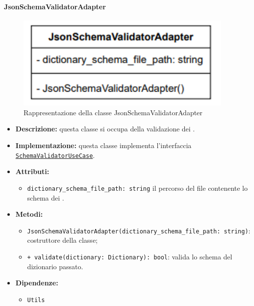 
\paragraph{JsonSchemaValidatorAdapter} \label{JsonSchemaValidatorAdapter}
\begin{figure}[H]
    \centering
    \includegraphics[width=0.95\textwidth]{assets/Backend/json_schema_validator_adapter.png}
    \caption{Rappresentazione della classe JsonSchemaValidatorAdapter}
  \end{figure}
\begin{itemize}
    \item \textbf{Descrizione:} questa classe si occupa della validazione dei .
    \item \textbf{Implementazione:} questa classe implementa l'interfaccia \hyperref[SchemaValidatorUseCase]{\texttt{SchemaValidatorUseCase}}.
    \item \textbf{Attributi:}
    \begin{itemize}
        \item \texttt{dictionary\_schema\_file\_path: string} il percorso del file contenente lo schema dei .
    \end{itemize}
    \item \textbf{Metodi:}
    \begin{itemize}
        \item \texttt{JsonSchemaValidatorAdapter(dictionary\_schema\_file\_path: string)}: costruttore della classe;
        \item \texttt{+ validate(dictionary: Dictionary): bool}: valida lo schema del dizionario passato.
    \end{itemize}
    \item \textbf{Dipendenze:}
    \begin{itemize}
        \item \texttt{Utils}
    \end{itemize}
\end{itemize} 

